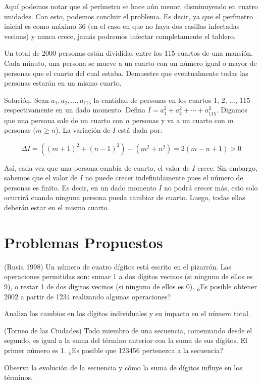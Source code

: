 \documentclass[11pt]{scrartcl}
\begin{document}
Aquí podemos notar que el perímetro se hace aún menor, disminuyendo en cuatro unidades. Con esto, podemos concluir el problema. Es decir, ya que el perímetro inicial es como máximo 36 (en el caso en que no haya dos casillas infectadas vecinas) y nunca crece, jamás podremos infectar completamente el tablero.

\begin{example}
    Un total de 2000 personas están divididas entre los 115 cuartos de una mansión. Cada minuto, una persona se mueve a un cuarto con un número igual o mayor de personas que el cuarto del cual estaba. Demuestre que eventualmente todas las personas estarán en un mismo cuarto.
\end{example}
Solución. Sean \( a_1, a_2, \ldots, a_{115} \) la cantidad de personas en los cuartos 1, 2, ..., 115 respectivamente en un dado momento. Defina \( I = a_1^2 + a_2^2 + \cdots + a_{115}^2 \). Digamos que una persona sale de un cuarto con \( n \) personas y va a un cuarto con \( m \) personas (\( m \geq n \)). La variación de \( I \) está dada por:

\[ \Delta I = ((m + 1)^2 + (n - 1)^2) - (m^2 + n^2) = 2(m - n + 1) > 0 \]

Así, cada vez que una persona cambia de cuarto, el valor de \( I \) crece. Sin embargo, sabemos que el valor de \( I \) no puede crecer indefinidamente pues el número de personas es finito. Es decir, en un dado momento \( I \) no podrá crecer más, esto solo ocurrirá cuando ninguna persona pueda cambiar de cuarto. Luego, todas ellas deberán estar en el mismo cuarto.


\section{Problemas Propuestos}

\begin{problem}
(Rusia 1998) Un número de cuatro dígitos está escrito en el pizarrón. Las operaciones permitidas son: sumar 1 a dos dígitos vecinos (si ninguno de ellos es 9), o restar 1 de dos dígitos vecinos (si ninguno de ellos es 0). ¿Es posible obtener 2002 a partir de 1234 realizando algunas operaciones?
\begin{hint}
Analiza los cambios en los dígitos individuales y su impacto en el número total.
\end{hint}
\end{problem}

\begin{problem}
(Torneo de las Ciudades) Todo miembro de una secuencia, comenzando desde el segundo, es igual a la suma del término anterior con la suma de sus dígitos. El primer número es 1. ¿Es posible que 123456 pertenezca a la secuencia?
\begin{hint}
Observa la evolución de la secuencia y cómo la suma de dígitos influye en los términos.
\end{hint}
\end{problem}
\end{document}

